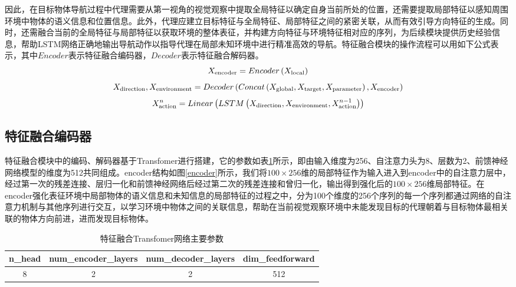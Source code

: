 因此，在目标物体导航过程中代理需要从第一视角的视觉观察中提取全局特征以确定自身当前所处的位置，还需要提取局部特征以感知周围环境中物体的语义信息和位置信息。此外，代理应建立目标特征与全局特征、局部特征之间的紧密关联，从而有效引导方向特征的生成。同时，还需融合当前的全局特征与局部特征以获取环境的整体表征，并构建方向特征与环境特征相对应的序列，为后续模块提供历史经验信息，帮助LSTM网络正确地输出导航动作以指导代理在局部未知环境中进行精准高效的导航。特征融合模块的操作流程可以用如下公式表示，其中$Encoder$表示特征融合编码器，$Decoder$表示特征融合解码器。
\begin{equation}
{X_{{\rm{encoder}}}} = Encoder\left( {{X_{{\rm{local}}}}} \right)
    \label{myeq37}
\end{equation}
\begin{equation}
    {X_{{\rm{direction}}}},{X_{{\rm{environment}}}} = Decoder\left( {Concat\left( {{X_{{\rm{global}}}},{X_{{\rm{target}}}},{X_{{\rm{parameter}}}}} \right),{X_{{\rm{encoder}}}}} \right)
    \label{myeq38}
\end{equation}
\begin{equation}
    X_{{\rm{action}}}^n = Linear\left( {LSTM\left( {{X_{{\rm{direction}}}},{X_{{\rm{environment}}}},X_{{\rm{action}}}^{n - 1}} \right)} \right)
    \label{myeq39}
\end{equation}

\subsection{特征融合编码器}
特征融合模块中的编码、解码器基于Transfomer进行搭建，它的参数如表\ref{特征融合tf参数}所示，即由输入维度为256、自注意力头为8、层数为2、前馈神经网络模型的维度为512共同组成。encoder结构如图\ref{encoder}所示，我们将$100 \times 256$维的局部特征作为输入进入到encoder中的自注意力层中，经过第一次的残差连接、层归一化和前馈神经网络后经过第二次的残差连接和曾归一化，输出得到强化后的$100 \times 256$维局部特征。在encoder强化表征环境中局部物体的语义信息和未知信息的局部特征的过程之中，分为100个维度的256个序列的每一个序列都通过网络的自注意力机制与其他序列进行交互，以学习环境中物体之间的关联信息，帮助在当前视觉观察环境中未能发现目标的代理朝着与目标物体最相关联的物体方向前进，进而发现目标物体。
\begin{table}
\caption{\label{特征融合tf参数}特征融合Transfomer网络主要参数}
\centering
\small
\begin{tabular}{cccc}
    \hline
    n\_head & num\_encoder\_layers & num\_decoder\_layers & dim\_feedforward \tabularnewline 
    \hline 
    8 & 2 & 2 & 512 \tabularnewline
    \hline 
\end{tabular}
\end{table}

